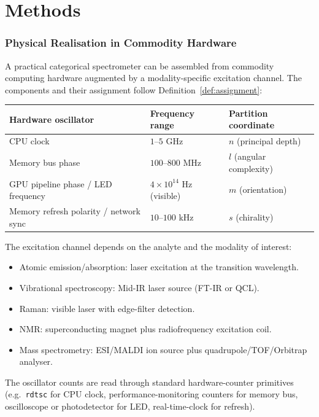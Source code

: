 \documentclass[twocolumn,11pt,a4paper]{article}
\theoremstyle{thmstyle}
\theoremstyle{axiomstyle}
\theoremstyle{definition}
\theoremstyle{remark}
\begin{document}
\part{Methods}
\label{part:methods}

\section{Physical Realisation in Commodity Hardware}
\label{sec:methods_hardware}

A practical categorical spectrometer can be assembled from commodity computing hardware augmented by a modality-specific excitation channel. The components and their assignment follow Definition~\ref{def:assignment}:

\begin{center}
\begin{tabular}{lll}
\toprule
Hardware oscillator & Frequency range & Partition coordinate\\
\midrule
CPU clock & $1$--$5$ GHz & $n$ (principal depth)\\
Memory bus phase & $100$--$800$ MHz & $l$ (angular complexity)\\
GPU pipeline phase / LED frequency & $4\times 10^{14}$ Hz (visible) & $m$ (orientation)\\
Memory refresh polarity / network sync & $10$--$100$ kHz & $s$ (chirality)\\
\bottomrule
\end{tabular}
\end{center}

The excitation channel depends on the analyte and the modality of interest:
\begin{itemize}[nosep]
\item Atomic emission/absorption: laser excitation at the transition wavelength.
\item Vibrational spectroscopy: Mid-IR laser source (FT-IR or QCL).
\item Raman: visible laser with edge-filter detection.
\item NMR: superconducting magnet plus radiofrequency excitation coil.
\item Mass spectrometry: ESI/MALDI ion source plus quadrupole/TOF/Orbitrap analyser.
\end{itemize}

The oscillator counts are read through standard hardware-counter primitives (e.g.\ \texttt{rdtsc} for CPU clock, performance-monitoring counters for memory bus, oscilloscope or photodetector for LED, real-time-clock for refresh).
\end{document}
